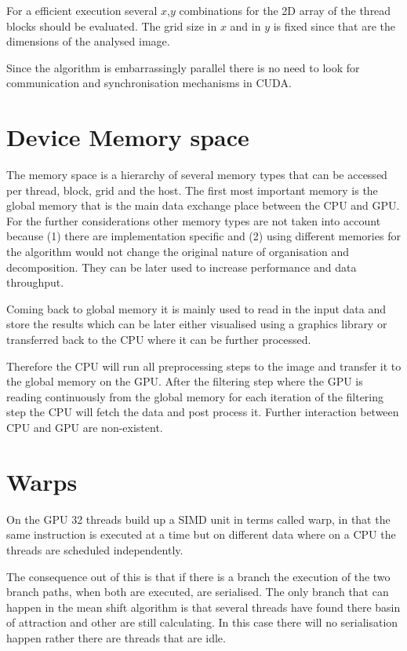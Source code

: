 For a efficient execution several $x$,$y$ combinations for the \gls{2D} array of the
thread blocks should be evaluated. The grid size in $x$ and in $y$ is fixed since
that are the dimensions of the analysed image. 

Since the algorithm is embarrassingly parallel there is no need to look for 
communication and synchronisation mechanisms in \gls{CUDA}.

\section{Device Memory space} %
\label{sec:cuda_memory}

The memory space is a hierarchy of several memory types that can be accessed per
thread, block, grid and the host. The first most important memory is the global
memory that is the main data exchange place between the \gls{CPU} and \gls{GPU}. 
For the further considerations other memory types are not taken into account 
because (1) there are implementation specific and (2) using different memories
for the algorithm would not change the original nature of organisation and
decomposition. They can be later used to increase performance and data throughput. 

Coming back to global memory it is mainly used to read in the input data and
store the results which can be later either visualised using a graphics library
or transferred back to the \gls{CPU} where it can be further processed. 

Therefore the \gls{CPU} will run all preprocessing steps to the image and
transfer it to the global memory on the \gls{GPU}. After the filtering step
where the \gls{GPU} is reading continuously from the global memory for each
iteration of the filtering step the \gls{CPU} will fetch the data and
post process it. Further interaction between \gls{CPU} and \gls{GPU} are
non-existent.


\section{Warps} %
\label{sec:warps}

On the \gls{GPU} 32 threads build up a \gls{SIMD} unit in 
terms called warp, in that the same instruction is executed at a time but on
different data where on a \gls{CPU} the threads are scheduled independently. 

The consequence out of this is that if there is a branch the execution of the
two branch paths, when both are executed, are serialised. The only branch that
can happen in the mean shift algorithm is that several threads have found there
basin of attraction and other are still calculating. In this case there will no
serialisation happen rather there are threads that are idle.

